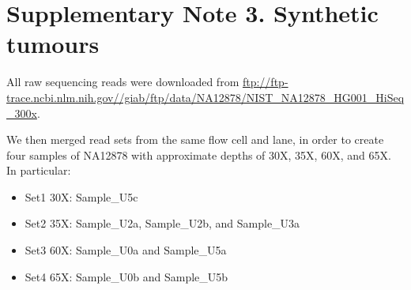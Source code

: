 \documentclass{article}
\begin{document}
\clearpage

\section*{Supplementary Note 3. Synthetic tumours}

All raw sequencing reads were downloaded from \url{ftp://ftp-trace.ncbi.nlm.nih.gov//giab/ftp/data/NA12878/NIST_NA12878_HG001_HiSeq_300x}.

We then merged read sets from the same flow cell and lane, in order to create four samples of NA12878 with approximate depths of 30X, 35X, 60X, and 65X. In particular:

\begin{itemize}
    \item Set1 30X: Sample\_U5c
    \item Set2 35X: Sample\_U2a, Sample\_U2b, and Sample\_U3a
    \item Set3 60X: Sample\_U0a and Sample\_U5a
    \item Set4 65X: Sample\_U0b and Sample\_U5b
\end{itemize}
\end{document}

